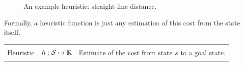 \documentclass[11pt]{article}
\def\Graph{\path node(A)[draw, initial, state] at (-2, 1) {A};
    \path node(B)[draw, state] at (-1, 3) {B};
    \path node(C)[draw, state, accepting] at (4, 2) {C};
    \path node(D)[draw, state] at (1, 1) {D};
    \path node(E)[draw, state] at (2, 3) {E};
    \path[draw] (A) --node[xshift=-0.2cm]{2} (B); 
    \path[draw] (B) --node[yshift=0.2cm]{4} (E); 
    \path[draw] (A) --node[yshift=0.2cm]{3} (D); 
    \path[draw] (A) --node[yshift=0.2cm]{5} (E); 
    \path[draw] (D) --node[yshift=0.2cm]{4} (C); 
    \path[draw] (E) --node[yshift=0.2cm]{4} (C); 
}
\begin{document}
\begin{figure}
  \centering

  \caption{\label{fig:heu} An example heuristic: straight-line distance.}
\end{figure}







Formally, a heuristic function is just any estimation of this cost from the state itself. 


\begin{center}
\begin{tabularx}{\linewidth}{llX}
  \toprule \\
 Heuristic & $h: \mathcal{S} \mapsto \mathbb{R}$ & Estimate of the cost from state $s$ to a goal state. \\\\
\bottomrule
\end{tabularx}
\end{center}
\end{document}

